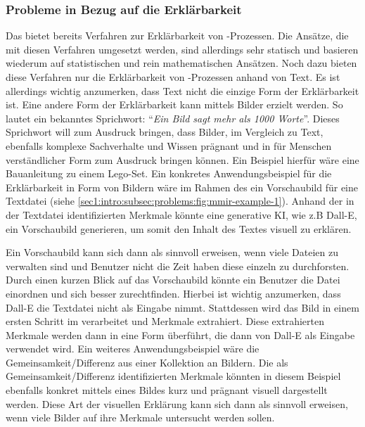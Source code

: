 \subsubsection{Probleme in Bezug auf die Erklärbarkeit}
\label{sec1:intro:subsec:problems:pb:explain}
Das \gmaf{} bietet bereits Verfahren zur Erklärbarkeit von \mmir{}-Prozessen. 
Die Ansätze, die mit diesen Verfahren umgesetzt werden, sind allerdings sehr statisch und basieren wiederum auf statistischen und rein mathematischen Ansätzen.
Noch dazu bieten diese Verfahren nur die Erklärbarkeit von \mmir{}-Prozessen anhand von Text.
Es ist allerdings wichtig anzumerken, dass Text nicht die einzige Form der Erklärbarkeit ist.
Eine andere Form der Erklärbarkeit kann mittels Bilder erzielt werden.
So lautet ein bekanntes Sprichwort: \enquote{\textit{Ein Bild sagt mehr als 1000 Worte}}.
Dieses Sprichwort will zum Ausdruck bringen, dass Bilder, im Vergleich zu Text, ebenfalls komplexe Sachverhalte und Wissen prägnant und in für Menschen verständlicher Form zum Ausdruck bringen können.
Ein Beispiel hierfür wäre eine Bauanleitung zu einem Lego-Set.
Ein konkretes Anwendungsbeispiel für die Erklärbarkeit in Form von Bildern wäre im Rahmen des \mmir{} ein Vorschaubild für eine Textdatei (siehe \cref{sec1:intro:subsec:problems:fig:mmir-example-1}).
Anhand der in der Textdatei identifizierten Merkmale könnte eine generative KI, wie z.B Dall-E, ein Vorschaubild generieren, um somit den Inhalt des Textes visuell zu erklären.
\par

\noindent
Ein Vorschaubild kann sich dann als sinnvoll erweisen, wenn viele Dateien zu verwalten sind und Benutzer nicht die Zeit haben diese einzeln zu durchforsten.
Durch einen kurzen Blick auf das Vorschaubild könnte ein Benutzer die Datei einordnen und sich besser zurechtfinden.
\newline
Hierbei ist wichtig anzumerken, dass Dall-E die Textdatei nicht als Eingabe nimmt. 
Stattdessen wird das Bild in einem ersten Schritt im \gmaf{} verarbeitet und Merkmale extrahiert. 
Diese extrahierten Merkmale werden dann in eine Form überführt, die dann von Dall-E als Eingabe verwendet wird.
\newline
Ein weiteres Anwendungsbeispiel wäre die Gemeinsamkeit/Differenz aus einer Kollektion an Bildern.
Die als Gemeinsamkeit/Differenz identifizierten Merkmale könnten in diesem Beispiel ebenfalls konkret mittels eines Bildes kurz und prägnant visuell dargestellt werden.
Diese Art der visuellen Erklärung kann sich dann als sinnvoll erweisen, wenn viele Bilder auf ihre Merkmale untersucht werden sollen. 
